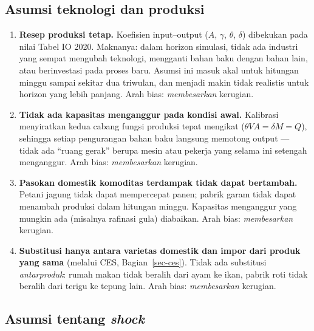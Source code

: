 \documentclass[
  manuscript=article,
  layout=publish,
  year=2026,
  volume=1,
]{den}
\providecommand{\tightlist}{%
  \setlength{\itemsep}{0pt}\setlength{\parskip}{0pt}}
\begin{document}
\subsection{Asumsi teknologi dan
produksi}\label{asumsi-teknologi-dan-produksi}

\begin{enumerate}
\def\labelenumi{\arabic{enumi}.}
\tightlist
\item
  \textbf{Resep produksi tetap.} Koefisien input--output (\(A\),
  \(\gamma\), \(\theta\), \(\delta\)) dibekukan pada nilai Tabel IO
  2020. Maknanya: dalam horizon simulasi, tidak ada industri yang sempat
  mengubah teknologi, mengganti bahan baku dengan bahan lain, atau
  berinvestasi pada proses baru. Asumsi ini masuk akal untuk hitungan
  minggu sampai sekitar dua triwulan, dan menjadi makin tidak realistis
  untuk horizon yang lebih panjang. Arah bias: \emph{membesarkan}
  kerugian.
\item
  \textbf{Tidak ada kapasitas menganggur pada kondisi awal.} Kalibrasi
  menyiratkan kedua cabang fungsi produksi tepat mengikat
  (\(\theta VA = \delta M = Q\)), sehingga setiap pengurangan bahan baku
  langsung memotong output --- tidak ada ``ruang gerak'' berupa mesin
  atau pekerja yang selama ini setengah menganggur. Arah bias:
  \emph{membesarkan} kerugian.
\item
  \textbf{Pasokan domestik komoditas terdampak tidak dapat bertambah.}
  Petani jagung tidak dapat mempercepat panen; pabrik garam tidak dapat
  menambah produksi dalam hitungan minggu. Kapasitas menganggur yang
  mungkin ada (misalnya rafinasi gula) diabaikan. Arah bias:
  \emph{membesarkan} kerugian.
\item
  \textbf{Substitusi hanya antara varietas domestik dan impor dari
  produk yang sama} (melalui CES, Bagian~\ref{sec-ces}). Tidak ada
  substitusi \emph{antarproduk}: rumah makan tidak beralih dari ayam ke
  ikan, pabrik roti tidak beralih dari terigu ke tepung lain. Arah bias:
  \emph{membesarkan} kerugian.
\end{enumerate}

\subsection{\texorpdfstring{Asumsi tentang
\emph{shock}}{Asumsi tentang shock}}\label{asumsi-tentang-shock}
\end{document}
